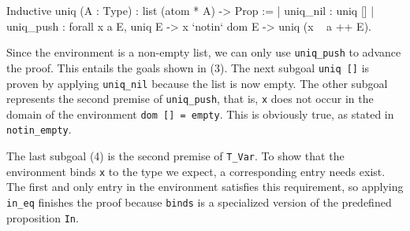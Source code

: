 \documentclass[a4paper, 11pt, fleqn]{scrreprt}
\newcommand{\coqinline}[1]{\texttt{#1}}
\begin{document}
\begin{coqcode}
Inductive uniq (A : Type) : list (atom * A) -> Prop :=
  | uniq_nil : uniq []
  | uniq_push : forall x a E, 
      uniq E -> 
      x `notin` dom E -> 
      uniq (x ~ a ++ E).
\end{coqcode}
Since the environment is a non-empty list, we can only use \coqinline{uniq_push} to advance the proof. This entails the goals shown in (3). The next subgoal \coqinline{uniq []} is proven by applying \coqinline{uniq_nil} because the list is now empty. The other subgoal represents the second premise of \coqinline{uniq_push}, that is, \coqinline{x} does not occur in the domain of the environment \coqinline{dom [] = empty}. This is obviously true, as stated in \coqinline{notin_empty}.
\par
The last subgoal (4) is the second premise of \coqinline{T_Var}. To show that the environment binds \coqinline{x} to the type we expect, a corresponding entry needs exist. The first and only entry in the environment satisfies this requirement, so applying \coqinline{in_eq} finishes the proof because \coqinline{binds} is a specialized version of the predefined proposition \coqinline{In}.
\end{document}
